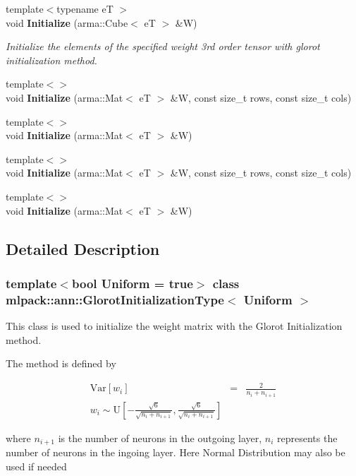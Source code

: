 \begin{DoxyCompactItemize}
{\footnotesize template$<$typename eT $>$ }\\void \textbf{ Initialize} (arma\+::\+Cube$<$ eT $>$ \&W)
\begin{DoxyCompactList}\small\item\em Initialize the elements of the specified weight 3rd order tensor with glorot initialization method. \end{DoxyCompactList}\item 
{\footnotesize template$<$$>$ }\\void \textbf{ Initialize} (arma\+::\+Mat$<$ eT $>$ \&W, const size\+\_\+t rows, const size\+\_\+t cols)
\item 
{\footnotesize template$<$$>$ }\\void \textbf{ Initialize} (arma\+::\+Mat$<$ eT $>$ \&W)
\item 
{\footnotesize template$<$$>$ }\\void \textbf{ Initialize} (arma\+::\+Mat$<$ eT $>$ \&W, const size\+\_\+t rows, const size\+\_\+t cols)
\item 
{\footnotesize template$<$$>$ }\\void \textbf{ Initialize} (arma\+::\+Mat$<$ eT $>$ \&W)
\end{DoxyCompactItemize}


\subsection{Detailed Description}
\subsubsection*{template$<$bool Uniform = true$>$\newline
class mlpack\+::ann\+::\+Glorot\+Initialization\+Type$<$ Uniform $>$}

This class is used to initialize the weight matrix with the Glorot Initialization method. 

The method is defined by

\begin{eqnarray*} \mathrm{Var}[w_i] &=& \frac{2}{n_i + n_{i+1}} \\ w_i \sim \mathrm{U}[-\frac{\sqrt{6}}{\sqrt{n_i + n_{i+1}}}, \frac{\sqrt{6}}{\sqrt{n_i + n_{i+1}}}] \end{eqnarray*}

where $ n_{i+1} $ is the number of neurons in the outgoing layer, $ n_i $ represents the number of neurons in the ingoing layer. Here Normal Distribution may also be used if needed

